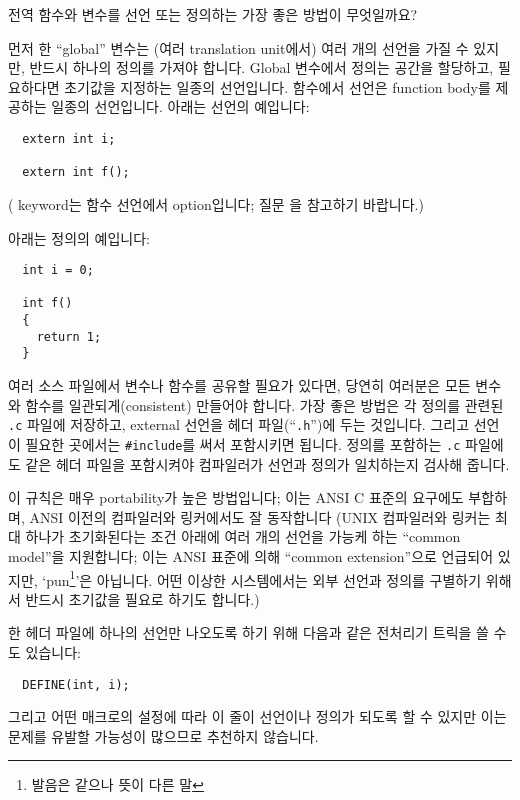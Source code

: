 \begin{faq}
	전역 함수와 변수를 선언 또는 정의하는 가장 좋은
	방법이 무엇일까요?

\A 
	먼저 한 ``global'' 변수는 (여러 translation unit에서) 
	여러 개의 선언을 가질 수 있지만, 반드시 하나의 정의를 가져야 합니다.
	Global 변수에서 정의는 공간을 할당하고, 필요하다면 초기값을 지정하는
	일종의 선언입니다.
	함수에서 선언은 function body를 제공하는 일종의 선언입니다.
	아래는 선언의 예입니다:

\begin{verbatim}
  extern int i;

  extern int f();
\end{verbatim}

	( keyword는 함수 선언에서 option입니다; 질문 을
	참고하기 바랍니다.)

	아래는 정의의 예입니다:
\begin{verbatim}
  int i = 0;

  int f()
  {
    return 1;
  }
\end{verbatim}
	여러 소스 파일에서 변수나 함수를 공유할 필요가 있다면,
	당연히 여러분은 모든 변수와 함수를 일관되게(consistent) 만들어야
	합니다.  가장 좋은 방법은 각 정의를 관련된 \verb+.c+ 파일에 저장하고,
	external 선언을 헤더 파일(``\verb+.h+'')에 두는 것입니다.  
	그리고 선언이 
	필요한 곳에서는 \verb+#include+를 써서 포함시키면 됩니다.  정의를 
	포함하는 \verb+.c+ 파일에도 같은 헤더 파일을 포함시켜야
	컴파일러가 선언과 정의가 일치하는지 검사해 줍니다.

	이 규칙은 매우 portability가 높은 방법입니다; 
	이는 ANSI C 표준의 요구에도 
	부합하며, ANSI 이전의 컴파일러와 링커에서도 잘 동작합니다 (UNIX
	컴파일러와 링커는 최대 하나가 초기화된다는 조건 아래에 여러 개의
	선언을
	가능케 하는 ``common model''을 지원합니다; 이는 ANSI 표준에 의해 
	``common extension''으로 언급되어 있지만, 
	`pun\footnote{발음은 같으나 뜻이 다른 말}'은 아닙니다.
	어떤 이상한 시스템에서는 외부 선언과 정의를 구별하기 위해서 
	반드시 초기값을 필요로 하기도 합니다.)

	한 헤더 파일에 하나의 선언만 나오도록 하기 위해 다음과 같은 전처리기
	트릭을 쓸 수도 있습니다:

\begin{verbatim}
  DEFINE(int, i);
\end{verbatim}

	그리고 어떤 매크로의 설정에 따라 이 줄이 선언이나 정의가 되도록 할 수
	있지만 이는 문제를 유발할 가능성이 많으므로 추천하지 않습니다.


\end{faq}

